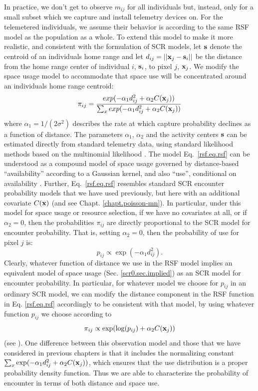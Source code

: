 In practice, we don't get to
observe $m_{ij}$ for all individuals but, instead, only for a small
subset which we capture and install telemetry devices on.
For the telemetered individuals, we assume their behavior is according
to the same RSF model as the population as a whole.
To extend this model to make it more realistic, and consistent with
the formulation of SCR models, let
${\bf s}$ denote the centroid of an individuals home range and let
$d_{ij} = ||{\bf x}_{j} - {\bf s}_{i}||$ be the distance from the home
range center of individual $i$, ${\bf s}_{i}$, to pixel $j$, ${\bf
  x}_{j}$. We modify the space usage model to accommodate that space
use will be concentrated around an individuals home range centroid:
\begin{equation}
 \pi_{ij} = \frac{ exp( -\alpha_{1} d_{ij}^{2} +\alpha_{2} C({\bf x}_{j}) ) }
{ \sum_{x} exp(-\alpha_{1} d_{ij}^{2} +\alpha_{2} C({\bf x}_{j}))}
\label{rsf.eq.rsf}
\end{equation}
where $\alpha_1=1/(2\sigma^2)$ describes the rate at which capture
probability declines as a function of distance.  The parameters
$\alpha_{1}$, $\alpha_{2}$ and the activity centers ${\bf s}$ can be
estimated directly from standard telemetry data, using standard
likelihood methods based on the multinomial likelihood
\citep{johnson_etal:2008}.
The model Eq.~\ref{rsf.eq.rsf} can be understood as a compound model
of space usage governed by distance-based ``availability'' according
to a Gaussian kernel, and also ``use'', conditional on availability
\citep{johnson_etal:2008, forester_etal:2009}.  Further,
Eq.~\ref{rsf.eq.rsf} resembles standard SCR encounter probability
models that we have used previously, but here with an additional
covariate $C({\bf x})$ (and see Chapt. \ref{chapt.poisson-mn}).  In
particular, under this model for space usage or resource selection, if
we have no covariates at all, or if $\alpha_{2} = 0$, then the
probabilities $\pi_{ij}$ are directly proportional to the SCR model
for encounter probability.  That is, setting $\alpha_{2} = 0$, then
the probability of use for pixel $j$ is:
\[
p_{ij} \propto  \exp( -\alpha_{1} d_{ij}^{2}).
\]
Clearly, whatever function of distance we use in the RSF model implies
an equivalent model of space usage (Sec. \ref{scr0.sec.implied}) as an
SCR model for encounter probability.  In particular, for whatever
model we choose for $p_{ij}$ in an ordinary SCR model, we can modify
the distance component in the RSF function in Eq. \ref{rsf.eq.rsf}
accordingly to be consistent with that model, by using whatever
function $p_{ij}$ we choose according to
\[
\pi_{ij} \propto \exp( \log(p_{ij}) + \alpha_{2} C({\bf x}_{j}) )
\]
(see \citep{forester_etal:2009}).
One difference between this observation model and those that we have
considered in previous chapters is that it includes the normalizing
constant $\sum_{x} \exp(-\alpha_{1} d_{ij}^{2} +\alpha_{2} C({\bf
  x}_{j}))$, which ensures that the use distribution is a proper
probability density function. Thus we are able to characterize the
probability of encounter in terms of both distance and space use.

